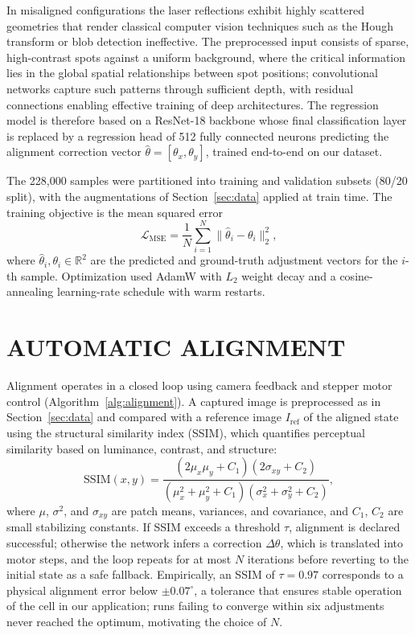 \documentclass[]{spie}  %
\begin{document}
In misaligned configurations the laser reflections exhibit highly scattered geometries that render classical computer vision techniques such as the Hough transform\cite{duda1972use} or blob detection\cite{lindeberg1998feature} ineffective. The preprocessed input consists of sparse, high-contrast spots against a uniform background, where the critical information lies in the global spatial relationships between spot positions; convolutional networks capture such patterns through sufficient depth, with residual connections enabling effective training of deep architectures.\cite{he2016deep} The regression model is therefore based on a ResNet-18 backbone whose final classification layer is replaced by a regression head of 512 fully connected neurons predicting the alignment correction vector $\hat{\theta} = [\theta_x, \theta_y]$, trained end-to-end on our dataset.

The 228{,}000 samples were partitioned into training and validation subsets (80/20 split), with the augmentations of Section~\ref{sec:data} applied at train time. The training objective is the mean squared error
\begin{equation}
\mathcal{L}_{\text{MSE}} = \frac{1}{N} \sum_{i=1}^{N} \|\hat{\theta}_i - \theta_i\|_2^2,
\end{equation}
where $\hat{\theta}_i, \theta_i \in \mathbb{R}^2$ are the predicted and ground-truth adjustment vectors for the $i$-th sample. Optimization used AdamW\cite{loshchilov2019decoupledweightdecayregularization} with $L_2$ weight decay and a cosine-annealing learning-rate schedule with warm restarts.\cite{loshchilov2017sgdrstochasticgradientdescent}

\section{AUTOMATIC ALIGNMENT}
\label{sec:alignment}

Alignment operates in a closed loop using camera feedback and stepper motor control (Algorithm~\ref{alg:alignment}). A captured image is preprocessed as in Section~\ref{sec:data} and compared with a reference image $I_{\text{ref}}$ of the aligned state using the structural similarity index (SSIM),\cite{1284395} which quantifies perceptual similarity based on luminance, contrast, and structure:
\begin{equation}
\text{SSIM}(x, y) = \frac{(2\mu_x \mu_y + C_1)(2\sigma_{xy} + C_2)}
{(\mu_x^2 + \mu_y^2 + C_1)(\sigma_x^2 + \sigma_y^2 + C_2)},
\end{equation}
where $\mu$, $\sigma^2$, and $\sigma_{xy}$ are patch means, variances, and covariance, and $C_1$, $C_2$ are small stabilizing constants. If SSIM exceeds a threshold $\tau$, alignment is declared successful; otherwise the network infers a correction $\Delta\theta$, which is translated into motor steps, and the loop repeats for at most $N$ iterations before reverting to the initial state as a safe fallback. Empirically, an SSIM of $\tau = 0.97$ corresponds to a physical alignment error below $\pm 0.07^\circ$, a tolerance that ensures stable operation of the cell in our application; runs failing to converge within six adjustments never reached the optimum, motivating the choice of $N$.
\end{document}
